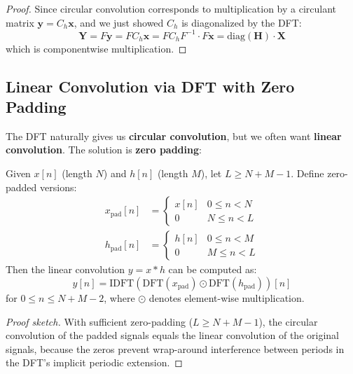 \begin{notechapter}
\begin{proof}
Since circular convolution corresponds to multiplication by a circulant 
matrix $\mathbf{y} = C_h \mathbf{x}$, and we just showed $C_h$ is 
diagonalized by the DFT:
\begin{equation}
\mathbf{Y} = F\mathbf{y} = F C_h \mathbf{x} 
           = F C_h F^{-1} \cdot F\mathbf{x} 
           = \text{diag}(\mathbf{H}) \cdot \mathbf{X}
\end{equation}
which is componentwise multiplication.
\end{proof}

\subsection{Linear Convolution via DFT with Zero Padding}

The DFT naturally gives us \textbf{circular convolution}, but we often 
want \textbf{linear convolution}. The solution is \textbf{zero padding}:

\begin{theorem}
Given $x[n]$ (length $N$) and $h[n]$ (length $M$), let $L \geq N+M-1$. 
Define zero-padded versions:
\begin{align*}
x_{\text{pad}}[n] &= \begin{cases}
x[n] & 0 \leq n < N \\
0 & N \leq n < L
\end{cases} \\
h_{\text{pad}}[n] &= \begin{cases}
h[n] & 0 \leq n < M \\
0 & M \leq n < L
\end{cases}
\end{align*}
Then the linear convolution $y = x * h$ can be computed as:
\begin{equation}
y[n] = \text{IDFT}\left(\text{DFT}(x_{\text{pad}}) \odot 
       \text{DFT}(h_{\text{pad}})\right)[n]
\end{equation}
for $0 \leq n \leq N+M-2$, where $\odot$ denotes element-wise 
multiplication.
\end{theorem}

\begin{proof}[Proof sketch]
With sufficient zero-padding ($L \geq N+M-1$), the circular convolution 
of the padded signals equals the linear convolution of the original 
signals, because the zeros prevent wrap-around interference between 
periods in the DFT's implicit periodic extension.
\end{proof}


\end{notechapter}

